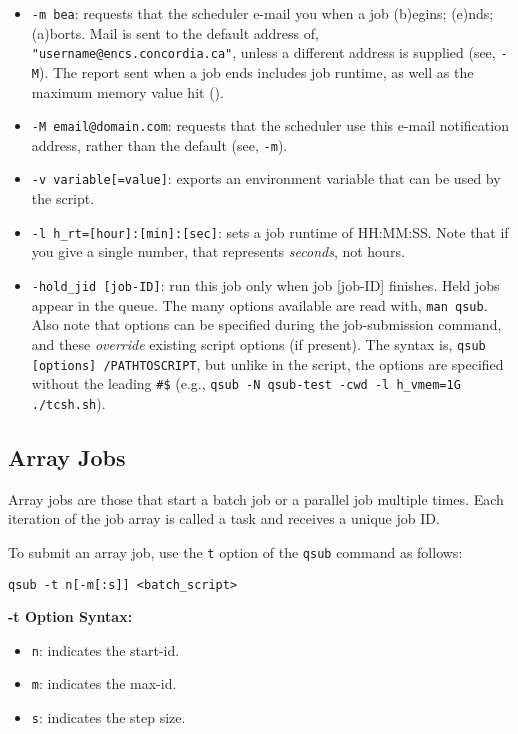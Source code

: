 \documentclass{easychair}
\begin{document}
\begin{itemize}
\item
\texttt{-m bea}: requests that the scheduler e-mail you when a job (b)egins; (e)nds; (a)borts. Mail is sent to the default address of, \texttt{"username@encs.concordia.ca"}, unless a different address is supplied (see, \texttt{-M}). The report sent when a job ends includes job 
runtime, as well as the maximum memory value hit (). 

\item
\texttt{-M email@domain.com}: requests that the scheduler use this e-mail notification address, rather than the default (see, \texttt{-m}). 

\item
\texttt{-v variable[=value]}: exports an environment variable that can be used by the script.

\item
\texttt{-l h\_rt=[hour]:[min]:[sec]}: sets a job runtime of HH:MM:SS. Note that if you give a single number, that represents \emph{seconds}, not hours. 

\item
\texttt{-hold\_jid [job-ID]}: run this job only when job [job-ID] finishes. Held jobs appear in the queue. 
The many  options available are read with, \texttt{man qsub}. Also note that  options can be specified during the job-submission command, and these \emph{override} existing script options (if present). The syntax is, \texttt{qsub [options] /PATHTOSCRIPT}, but unlike in the script, the options are specified without the leading \verb+#$+ (e.g., \texttt{qsub -N qsub-test -cwd -l h\_vmem=1G ./tcsh.sh}). 
\end{itemize}

\subsection{Array Jobs}
Array jobs are those that start a batch job or a parallel job multiple times. Each iteration of the job array is called a task and receives a unique job ID.

To submit an array job, use the \texttt{\-t} option of the \texttt{qsub} command as follows:

\begin{verbatim}
qsub -t n[-m[:s]] <batch_script>
\end{verbatim}

\textbf{-t Option Syntax:}
\begin{itemize}
\item
\texttt{n}: indicates the start-id.
\item
\texttt{m}: indicates the max-id.
\item
\texttt{s}: indicates the step size.
\end{itemize}
\end{document}
